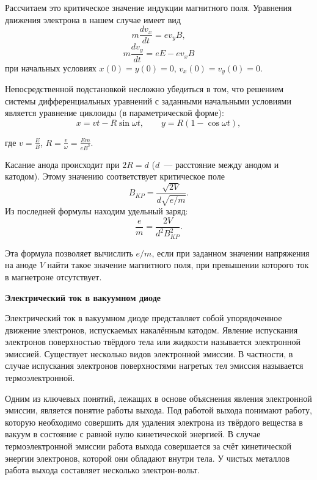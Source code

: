 \documentclass[a4paper,10pt,twoside]{article}
\begin{document}
Рассчитаем это критическое значение индукции магнитного поля. Уравнения движения электрона в нашем случае имеет вид
\begin{equation}
m\frac{dv_x}{dt}=ev_y B,
\end{equation}
\begin{equation}
m\frac{dv_y}{dt}=eE-ev_x B
\end{equation}
при начальных условиях $x(0)=y(0)=0$, $v_x(0)=v_y(0)=0$.

Непосредственной подстановкой несложно убедиться в том, что решением системы дифференциальных уравнений с заданными
начальными условиями является уравнение циклоиды (в параметрической форме):
\begin{equation}
x = vt - R\sin\omega t,\qquad y = R(1-\cos\omega t),
\end{equation}

где $ v=\frac{E}{B}$, $R=\frac{v}{\omega}=\frac{Em}{eB^2}$.

Касание анода происходит при $2R=d$ ($d$~--- расстояние между анодом и катодом). Этому значению соответствует
критическое поле
\begin{equation}
B_{KP}=\frac{\sqrt{2V}}{d\sqrt{e/m}}.
\end{equation}
Из последней формулы находим удельный заряд:
\begin{equation}
\frac{e}{m}=\frac{2V}{d^2B_{KP}^2}.
\end{equation}

Эта формула позволяет вычислить $e/m$, если при заданном значении напряжения на аноде $V$ найти такое значение
магнитного поля, при превышении которого ток в магнетроне отсутствует.

{\bf \Large Электрический ток в вакуумном диоде}

Электрический ток в вакуумном диоде представляет собой упорядоченное движение электронов, испускаемых накалённым
катодом. Явление испускания электронов поверхностью твёрдого тела или жидкости называется {\textsf{электронной эмиссией}}.
Существует несколько видов электронной эмиссии. В частности, в случае испускания электронов поверхностями нагретых тел эмиссия называется {\textsf{термоэлектронной}}.

Одним из ключевых понятий, лежащих в основе объяснения явления электронной эмиссии, является понятие {\textsf{работы выхода}}. Под работой выхода понимают работу, которую необходимо совершить для удаления электрона из твёрдого вещества в вакуум в состояние с равной нулю кинетической энергией. В случае термоэлектронной эмиссии работа выхода совершается за счёт кинетической энергии электронов, которой они обладают внутри тела. У чистых металлов работа выхода составляет несколько электрон-вольт.
\end{document}
